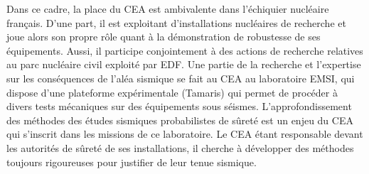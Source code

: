 














Dans ce cadre, la place du CEA est ambivalente dans l'échiquier nucléaire français.
D'une part, il est exploitant d'install\-ations nucléaires de recherche 
et joue alors son propre rôle quant à la démonstration de robustesse de ses équipements.
Aussi, il participe conjointement à des actions de recherche relatives au parc nucléaire civil exploité par EDF.
Une partie de la recherche et l'expertise sur les conséquences de l'aléa sismique %
se fait au CEA au laboratoire EMSI, qui dispose d'une plateforme expérimentale (Tamaris) qui permet de procéder à divers tests mécaniques sur des équipements sous séismes. 
L'approfondissement des méthodes des études sismiques probabilistes de sûreté est un enjeu du CEA qui s'inscrit dans les missions de ce laboratoire. Le CEA étant responsable devant les autorités de sûreté de ses installations, %
il cherche à développer des méthodes toujours rigoureuses pour justifier de leur tenue sismique.


